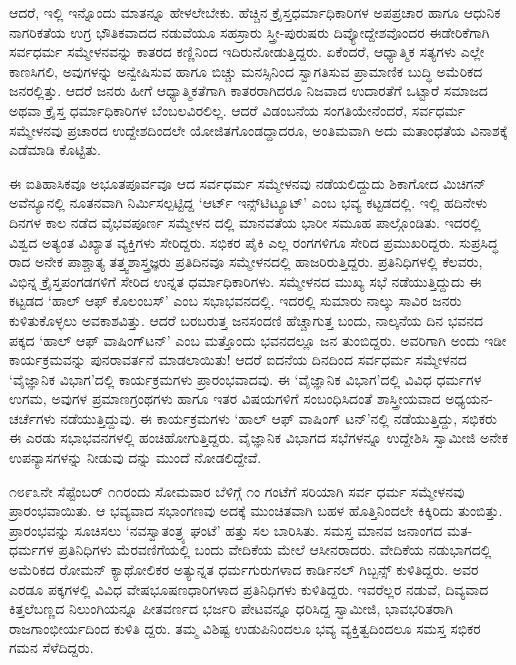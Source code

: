 ಆದರೆ, ಇಲ್ಲಿ ಇನ್ನೊಂದು ಮಾತನ್ನೂ ಹೇಳಲೇಬೇಕು. ಹೆಚ್ಚಿನ ಕ್ರೈಸ್ತಧರ್ಮಾಧಿಕಾರಿಗಳ ಅಪಪ್ರಚಾರ ಹಾಗೂ ಆಧುನಿಕ ನಾಗರಿಕತೆಯ ಉಗ್ರ ಭೌತಿಕವಾದದ ನಡುವೆಯೂ ಸಹಸ್ರಾರು ಸ್ತ್ರೀ-ಪುರುಷರು ದಿವ್ಯೋದ್ದೇಶವೊಂದರ ಈಡೇರಿಕೆಗಾಗಿ ಸರ್ವಧರ್ಮ ಸಮ್ಮೇಳನವನ್ನು ಕಾತರದ ಕಣ್ಣಿನಿಂದ ಇದಿರುನೋಡುತ್ತಿದ್ದರು. ಏಕೆಂದರೆ, ಆಧ್ಯಾತ್ಮಿಕ ಸತ್ಯಗಳು ಎಲ್ಲೇ ಕಾಣಸಿಗಲಿ, ಅವುಗಳನ್ನು ಅನ್ವೇಷಿಸುವ ಹಾಗೂ ಬಿಚ್ಚು ಮನಸ್ಸಿನಿಂದ ಸ್ವಾಗತಿಸುವ ಪ್ರಾಮಾಣಿಕ ಬುದ್ಧಿ ಅಮೆರಿಕದ ಜನರಲ್ಲಿತ್ತು. ಆದರೆ ಜನರು ಹೀಗೆ ಆಧ್ಯಾತ್ಮಿಕತೆಗಾಗಿ ಕಾತರರಾಗಿದರೂ ನಿಜವಾದ ಉದಾರತೆಗೆ ಒಟ್ಟಾರೆ ಸಮಾಜದ ಅಥವಾ ಕ್ರೈಸ್ತ ಧರ್ಮಾಧಿಕಾರಿಗಳ ಬೆಂಬಲವಿರಲಿಲ್ಲ. ಆದರೆ ವಿಡಂಬನೆಯ ಸಂಗತಿಯೇನೆಂದರೆ, ಸರ್ವಧರ್ಮ ಸಮ್ಮೇಳನವು ಪ್ರಚಾರದ ಉದ್ದೇಶದಿಂದಲೇ ಯೋಜಿತಗೊಂಡದ್ದಾದರೂ, ಅಂತಿಮವಾಗಿ ಅದು ಮತಾಂಧತೆಯ ವಿನಾಶಕ್ಕೆ ಎಡೆಮಾಡಿ ಕೊಟ್ಟಿತು.

ಈ ಐತಿಹಾಸಿಕವೂ ಅಭೂತಪೂರ್ವವೂ ಆದ ಸರ್ವಧರ್ಮ ಸಮ್ಮೇಳನವು ನಡೆಯಲಿದ್ದುದು ಶಿಕಾಗೋದ ಮಿಚಿಗನ್ ಅವೆನ್ಯೂನಲ್ಲಿ ನೂತನವಾಗಿ ನಿರ್ಮಿಸಲ್ಪಟ್ಟಿದ್ದ ‘ಆರ್ಟ್ ಇನ್ಸ್​ಟಿಟ್ಯೂಟ್​’ ಎಂಬ ಭವ್ಯ ಕಟ್ಟಡದಲ್ಲಿ. ಇಲ್ಲಿ ಹದಿನೇಳು ದಿನಗಳ ಕಾಲ ನಡೆದ ವೈಭವಪೂರ್ಣ ಸಮ್ಮೇಳನ ದಲ್ಲಿ ಮಾನವತೆಯ ಭಾರೀ ಸಮೂಹ ಪಾಲ್ಗೊಂಡಿತು. ಇದರಲ್ಲಿ ವಿಶ್ವದ ಅತ್ಯಂತ ವಿಖ್ಯಾತ ವ್ಯಕ್ತಿಗಳು ಸೇರಿದ್ದರು. ಸಭಿಕರ ಪೈಕಿ ಎಲ್ಲ ರಂಗಗಳಿಗೂ ಸೇರಿದ ಪ್ರಮುಖರಿದ್ದರು. ಸುಪ್ರಸಿದ್ಧ ರಾದ ಅನೇಕ ಪಾಶ್ಚಾತ್ಯ ತತ್ತ್ವಶಾಸ್ತ್ರಜ್ಞರು ಪ್ರತಿದಿನವೂ ಸಮ್ಮೇಳನದಲ್ಲಿ ಹಾಜರಿರುತ್ತಿದ್ದರು. ಪ್ರತಿನಿಧಿಗಳಲ್ಲಿ ಕೆಲವರು, ವಿಭಿನ್ನ ಕ್ರೈಸ್ತಪಂಗಡಗಳಿಗೆ ಸೇರಿದ ಉನ್ನತ ಧರ್ಮಾಧಿಕಾರಿಗಳು. ಸಮ್ಮೇಳನದ ಮುಖ್ಯ ಸಭೆ ನಡೆಯುತ್ತಿದ್ದುದು ಈ ಕಟ್ಟಡದ ‘ಹಾಲ್ ಆಫ್ ಕೊಲಂಬಸ್​’ ಎಂಬ ಸಭಾಭವನದಲ್ಲಿ. ಇದರಲ್ಲಿ ಸುಮಾರು ನಾಲ್ಕು ಸಾವಿರ ಜನರು ಕುಳಿತುಕೊಳ್ಳಲು ಅವಕಾಶವಿತ್ತು. ಆದರೆ ಬರಬರುತ್ತ ಜನಸಂದಣಿ ಹೆಚ್ಚಾಗುತ್ತ ಬಂದು, ನಾಲ್ಕನೆಯ ದಿನ ಭವನದ ಪಕ್ಕದ ‘ಹಾಲ್ ಆಫ್ ವಾಷಿಂಗ್​ಟನ್​’ ಎಂಬ ಮತ್ತೊಂದು ಭವನದಲ್ಲೂ ಜನ ತುಂಬಿದ್ದರು. ಅವರಿಗಾಗಿ ಅಂದು ಇಡೀ ಕಾರ್ಯಕ್ರಮವನ್ನು ಪುನರಾವರ್ತನೆ ಮಾಡಲಾಯಿತು! ಆದರೆ ಐದನೆಯ ದಿನದಿಂದ ಸರ್ವಧರ್ಮ ಸಮ್ಮೇಳನದ ‘ವೈಜ್ಞಾನಿಕ ವಿಭಾಗ’ದಲ್ಲಿ ಕಾರ್ಯಕ್ರಮಗಳು ಪ್ರಾರಂಭವಾದವು. ಈ ‘ವೈಜ್ಞಾನಿಕ ವಿಭಾಗ’ದಲ್ಲಿ ವಿವಿಧ ಧರ್ಮಗಳ ಉಗಮ, ಅವುಗಳ ಪ್ರಮಾಣಗ್ರಂಥಗಳು ಹಾಗೂ ಇತರ ವಿಷಯಗಳಿಗೆ ಸಂಬಂಧಿಸಿದಂತೆ ಶಾಸ್ತ್ರೀಯವಾದ ಅಧ್ಯಯನ-ಚರ್ಚೆಗಳು ನಡೆಯುತ್ತಿದ್ದುವು. ಈ ಕಾರ್ಯಕ್ರಮಗಳು ‘ಹಾಲ್ ಆಫ್ ವಾಷಿಂಗ್ ಟನ್​’ನಲ್ಲಿ ನಡೆಯುತ್ತಿದ್ದು, ಸಭಿಕರು ಈ ಎರಡು ಸಭಾಭವನಗಳಲ್ಲಿ ಹಂಚಿಹೋಗುತ್ತಿದ್ದರು. ವೈಜ್ಞಾನಿಕ ವಿಭಾಗದ ಸಭೆಗಳನ್ನೂ ಉದ್ದೇಶಿಸಿ ಸ್ವಾಮೀಜಿ ಅನೇಕ ಉಪನ್ಯಾಸಗಳನ್ನು ನೀಡುವು ದನ್ನು ಮುಂದೆ ನೋಡಲಿದ್ದೇವೆ.

೧೮೯೩ನೇ ಸೆಪ್ಟೆಂಬರ್ ೧೧ರಂದು ಸೋಮವಾರ ಬೆಳಿಗ್ಗೆ ೧ಂ ಗಂಟೆಗೆ ಸರಿಯಾಗಿ ಸರ್ವ ಧರ್ಮ ಸಮ್ಮೇಳನವು ಪ್ರಾರಂಭವಾಯಿತು. ಆ ಭವ್ಯವಾದ ಸಭಾಂಗಣವು ಅದಕ್ಕೆ ಮುಂಚಿತವಾಗಿ ಬಹಳ ಹೊತ್ತಿನಿಂದಲೇ ಕಿಕ್ಕಿರಿದು ತುಂಬಿತ್ತು. ಪ್ರಾರಂಭವನ್ನು ಸೂಚಿಸಲು ‘ನವಸ್ವಾತಂತ್ರ್ಯ ಘಂಟೆ’ ಹತ್ತು ಸಲ ಬಾರಿಸಿತು. ಸಮಸ್ತ ಮಾನವ ಜನಾಂಗದ ಮತ-ಧರ್ಮಗಳ ಪ್ರತಿನಿಧಿಗಳು ಮೆರವಣಿಗೆಯಲ್ಲಿ ಬಂದು ವೇದಿಕೆಯ ಮೇಲೆ ಆಸೀನರಾದರು. ವೇದಿಕೆಯ ನಡುಭಾಗದಲ್ಲಿ ಅಮೆರಿಕದ ರೋಮನ್ ಕ್ಯಾಥೋಲಿಕರ ಅತ್ಯುನ್ನತ ಧರ್ಮಗುರುಗಳಾದ ಕಾರ್ಡಿನಲ್ ಗಿಬ್ಬನ್ಸ್ ಕುಳಿತಿದ್ದರು. ಅವರ ಎರಡೂ ಪಕ್ಕಗಳಲ್ಲಿ ವಿವಿಧ ವೇಷಭೂಷಣಧಾರಿಗಳಾದ ಪ್ರತಿನಿಧಿಗಳು ಕುಳಿತಿದ್ದರು. ಇವರೆಲ್ಲರ ನಡುವೆ, ದಿವ್ಯವಾದ ಕಿತ್ತಲೆಬಣ್ಣದ ನಿಲುಂಗಿಯನ್ನೂ ಪೀತವರ್ಣದ ಭರ್ಜರಿ ಪೇಟವನ್ನೂ ಧರಿಸಿದ್ದ ಸ್ವಾಮೀಜಿ, ಭಾವಭರಿತರಾಗಿ ರಾಜಗಾಂಭೀರ್ಯದಿಂದ ಕುಳಿತಿ ದ್ದರು. ತಮ್ಮ ವಿಶಿಷ್ಟ ಉಡುಪಿನಿಂದಲೂ ಭವ್ಯ ವ್ಯಕ್ತಿತ್ವದಿಂದಲೂ ಸಮಸ್ತ ಸಭಿಕರ ಗಮನ ಸೆಳೆದಿದ್ದರು.

